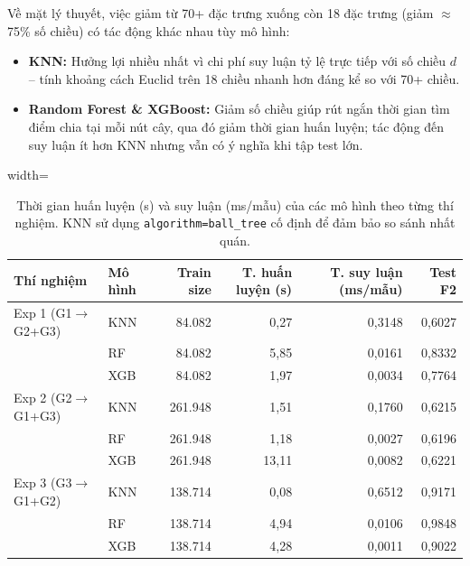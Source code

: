 Về mặt lý thuyết, việc giảm từ 70+ đặc trưng xuống còn 18 đặc trưng (giảm $\approx$75\% số chiều) có tác động khác nhau tùy mô hình:
\begin{itemize}
    \item \textbf{KNN:} Hưởng lợi nhiều nhất vì chi phí suy luận tỷ lệ trực tiếp với số chiều $d$ -- tính khoảng cách Euclid trên 18 chiều nhanh hơn đáng kể so với 70+ chiều.
    \item \textbf{Random Forest \& XGBoost:} Giảm số chiều giúp rút ngắn thời gian tìm điểm chia tại mỗi nút cây, qua đó giảm thời gian huấn luyện; tác động đến suy luận ít hơn KNN nhưng vẫn có ý nghĩa khi tập test lớn.
\end{itemize}

\begin{table}[H]
\caption{Thời gian huấn luyện (s) và suy luận (ms/mẫu) của các mô hình theo từng thí nghiệm. KNN sử dụng \texttt{algorithm=ball\_tree} cố định để đảm bảo so sánh nhất quán.}
\label{tab:timing}
\begin{center}
\begin{adjustbox}{width=\linewidth}
\begin{tabular}{|l|l|r|r|r|r|}
\hline
\textbf{Thí nghiệm} & \textbf{Mô hình} & \textbf{Train size} & \textbf{T. huấn luyện (s)} & \textbf{T. suy luận (ms/mẫu)} & \textbf{Test F2} \\
\hline
Exp 1 (G1$\to$G2+G3) & KNN &  84.082 & 0,27 & 0,3148 & 0,6027 \\
                      & RF  &  84.082 & 5,85 & 0,0161 & 0,8332 \\
                      & XGB &  84.082 & 1,97 & 0,0034 & 0,7764 \\
\hline
Exp 2 (G2$\to$G1+G3) & KNN & 261.948 & 1,51 & 0,1760 & 0,6215 \\
                      & RF  & 261.948 & 1,18 & 0,0027 & 0,6196 \\
                      & XGB & 261.948 & 13,11 & 0,0082 & 0,6221 \\
\hline
Exp 3 (G3$\to$G1+G2) & KNN & 138.714 & 0,08 & 0,6512 & 0,9171 \\
                      & RF  & 138.714 & 4,94 & 0,0106 & 0,9848 \\
                      & XGB & 138.714 & 4,28 & 0,0011 & 0,9022 \\
\hline
\end{tabular}
\end{adjustbox}
\end{center}
\end{table}

